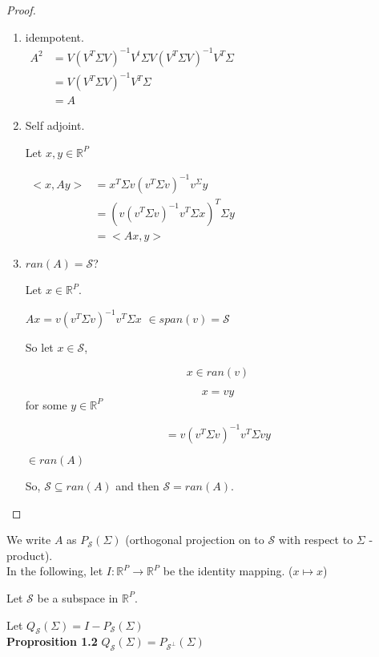 \documentclass[11pt,fleqn]{book} %
\begin{document}
\begin{proof}
	\begin{enumerate}
		\item idempotent.\\
		$\begin{aligned}
			A^2 &= V(V^T\Sigma V)^{-1} V^t \Sigma V (V^T \Sigma V)^{-1} V^T \Sigma\\
				&= V(V^T \Sigma V) ^{-1}V^T \Sigma\\
				&= A
		\end{aligned}$

		\item Self adjoint.

		Let $x, y \in \mathbb{R}^P$

		$\begin{aligned}
					<x,Ay> &= x^T \Sigma v(v^T \Sigma v)^{-1}v^ \Sigma y\\
					&= (v(v^T \Sigma v)^{-1} v^T \Sigma x)^T \Sigma y\\
					&= <Ax, y>
				\end{aligned}$

		\item $ran(A)= \mathscr{S}$?

		Let $x \in \mathbb{R}^P$. 

		$Ax = v(v^T \Sigma v)^{-1} v^T \Sigma x$
		$\in span(v) = \mathscr{S}$ 

		So let $x \in \mathscr{S}$, 

		$$x \in ran(v)$$

		$$x = vy $$ for some $y \in \mathbb{R}^P$

		$$= v(v^T \Sigma v)^{-1} v^T \Sigma vy $$

		$\in ran(A)$

		So, $\mathscr{S} \subseteq ran(A)$ and then $\mathscr{S} = ran(A)$.
	\end{enumerate}
\end{proof}

We write $A$ as $P_\mathscr{S} (\Sigma)$ (orthogonal projection on to $\mathscr{S}$ with respect to $\Sigma$ - product). \\ 

In the following, let $I: \mathbb{R}^P \rightarrow \mathbb{R}^P$ be the identity mapping. ($x \mapsto x$)

Let $\mathscr{S}$ be a subspace in $\mathbb{R}^P$. 

Let $Q_\mathscr{S} (\Sigma) = I - P_\mathscr{S} (\Sigma)$\\

\textbf{Proprosition 1.2} $Q_\mathscr{S} (\Sigma) = P_{\mathscr{S}^\perp} (\Sigma)$
\end{document}
